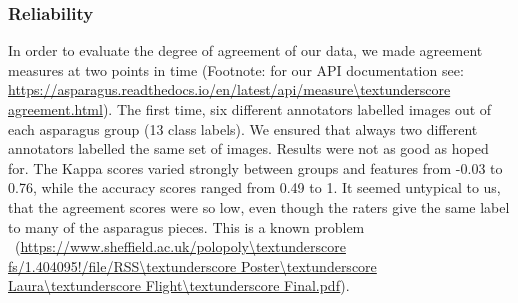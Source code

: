 \subsubsection{Reliability}

In order to evaluate the degree of agreement of our data, we made agreement measures at two points in time (Footnote: for our API documentation see: \url{https://asparagus.readthedocs.io/en/latest/api/measure\textunderscore agreement.html}). The first time, six different annotators labelled images out of each asparagus group (13 class labels). We ensured that always two different annotators labelled the same set of images. Results were not as good as hoped for. The Kappa scores varied strongly between groups and features from -0.03 to 0.76, while the accuracy scores ranged from 0.49 to 1. It seemed untypical to us, that the agreement scores were so low, even though the raters give the same label to many of the asparagus pieces. This is a known problem~\citep{powers2012problem} ~\citep{sim2005kappa} ~\citep{feinstein1990high}(\url{https://www.sheffield.ac.uk/polopoly\textunderscore fs/1.404095!/file/RSS\textunderscore Poster\textunderscore Laura\textunderscore Flight\textunderscore Final.pdf}). \\
\\
